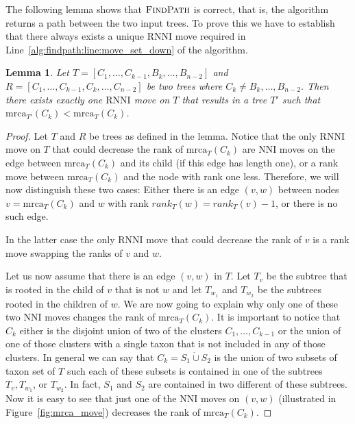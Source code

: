 \documentclass{amsart}
\newcommand{\mrca}{\mathrm{mrca}}
\newcommand{\nni}{\mathrm{NNI}}
\newcommand{\rnni}{\mathrm{RNNI}}
\newcommand{\findpath}{\textsc{FindPath}}
\newtheorem{lemma}[definition]{Lemma}
\begin{document}
The following lemma shows that $\findpath$ is correct, that is, the algorithm returns a path between the two input trees.
To prove this we have to establish that there always exists a unique $\rnni$ move required in Line~\ref{alg:findpath:line:move_set_down} of the algorithm.

\begin{lemma}
Let $T = [C_1, \ldots, C_{k-1}, B_{k}, \ldots, B_{n-2}]$ and $R = [C_1, \ldots, C_{k-1}, C_k, \ldots, C_{n-2}]$ be two trees where $C_k \neq B_k, \ldots, B_{n-2}$.
Then there exists exactly one $\rnni$ move on $T$ that results in a tree $T'$ such that $\mrca_{T'}(C_k) < \mrca_{T}(C_k)$.
\label{lemma:mrca_move}
\end{lemma}

\begin{proof}
Let $T$ and $R$ be trees as defined in the lemma.
Notice that the only $\rnni$ move on $T$ that could decrease the rank of $\mrca_T(C_k)$ are $\nni$ moves on the edge between $\mrca_T(C_k)$ and its child (if this edge has length one), or a rank move between $\mrca_T(C_k)$ and the node with rank one less.
Therefore, we will now distinguish these two cases:
Either there is an edge $(v,w)$ between nodes $v = \mrca_T(C_k)$ and $w$ with rank $rank_T(w) = rank_T(v) - 1$, or there is no such edge.

In the latter case the only $\rnni$ move that could decrease the rank of $v$ is a rank move swapping the ranks of $v$ and $w$.

Let us now assume that there is an edge $(v,w)$ in $T$.
Let $T_v$ be the subtree that is rooted in the child of $v$ that is not $w$ and let $T_{w_1}$ and $T_{w_2}$ be the subtrees rooted in the children of $w$.
We are now going to explain why only one of these two $\nni$ moves changes the rank of $\mrca_T(C_k)$.
It is important to notice that $C_k$ either is the disjoint union of two of the clusters $C_1, \ldots, C_{k-1}$ or the union of one of those clusters with a single taxon that is not included in any of those clusters.
In general we can say that $C_k = S_1 \dot\cup S_2$ is the union of two subsets of taxon set of $T$ such each of these subsets is contained in one of the subtrees $T_v, T_{w_1}$, or $T_{w_2}$.
In fact, $S_1$ and $S_2$ are contained in two different of these subtrees.
Now it is easy to see that just one of the $\nni$ moves on $(v,w)$ (illustrated in Figure~\ref{fig:mrca_move}) decreases the rank of $\mrca_T(C_k)$.


\end{proof}
\end{document}
